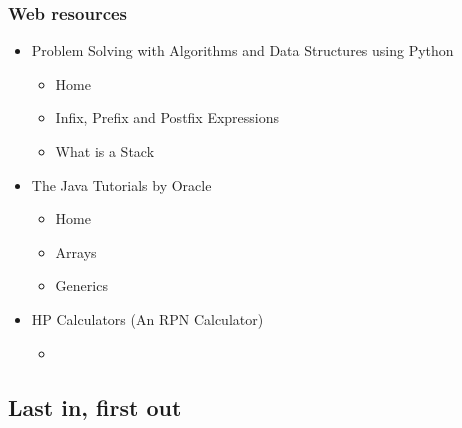 \documentclass[aspectratio=169,10pt,compress]{beamer}
\begin{document}
\begin{frame}\frametitle{Web resources}
	\begin{itemize}

		\item 
		Problem Solving with Algorithms and Data Structures using Python
		\begin{itemize}
			
			\item 
			Home~\cite{pswads}
		
			\item 
			Infix, Prefix and Postfix Expressions~\cite{pswadsPostfix}
			
			\item
			What is a Stack~\cite{pswadsStack} 
			
		\end{itemize}

		\item 
		The Java Tutorials by Oracle
		\begin{itemize}
			
			\item 
			Home~\cite{TheJavaTutorials}
			
			\item
			Arrays~\cite{TheJavaTutorialsArray}
			
			\item
			Generics~\cite{TheJavaTutorialsGenerics}
			
		\end{itemize}
		
		\item
		HP Calculators (An RPN Calculator)
		\begin{itemize}
			
			\item 
		\end{itemize}
	\end{itemize}
\end{frame}




\subsection[LIFO]{Last in, first out}
\end{document}
